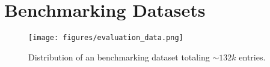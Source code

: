 




\section{Benchmarking Datasets}
\label{sec:mmlu_dataset}

\begin{figure}[htb!]
\centering
\texttt{[image: figures/evaluation\_data.png]}
\vspace{-0.3cm}
\caption{Distribution of an benchmarking dataset totaling $\sim132k$ entries.
}
\label{fig:bangla_eval_data}
\vspace{-0.3cm}
\end{figure}

